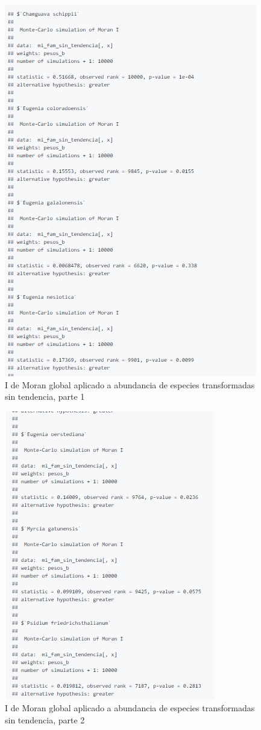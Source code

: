 \documentclass[11pt,]{article}
\begin{document}
\begin{figure}
\centering
\includegraphics{ee_files/figure-markdown_github/moranglobal1.png}
\caption{I de Moran global aplicado a abundancia de especies
transformadas sin tendencia, parte 1 \label{fig:moranglobal1}}
\end{figure}

\begin{figure}
\centering
\includegraphics{ee_files/figure-markdown_github/moranglobal2.png}
\caption{I de Moran global aplicado a abundancia de especies
transformadas sin tendencia, parte 2 \label{fig:moranglobal2}}
\end{figure}
\end{document}
